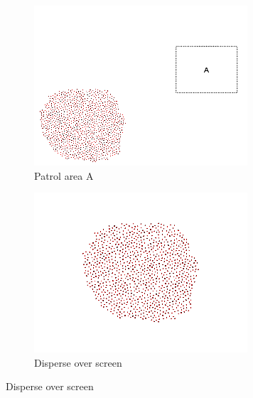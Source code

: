 \documentclass[]{article}
\begin{document}
\begin{figure}
	\ContinuedFloat
	\centering	
		\begin{subfigure}{0.42\textwidth}
		\centering
		\includegraphics[width=\linewidth]{slide_images/Swarm_Robot_Control_-_1000_Robot_0035.png}
		\caption{Patrol area A}
		\label{fig:sub1}
	\end{subfigure}%
	\begin{subfigure}{0.42\textwidth}
		\centering
		\includegraphics[width=\linewidth]{slide_images/Swarm_Robot_Control_-_1000_Robot_0037.png}
		\caption{Disperse over screen}
		\label{fig:sub2}
	\end{subfigure}
	\label{fig:1000_robot_slides}
\end{figure}
\end{document}
